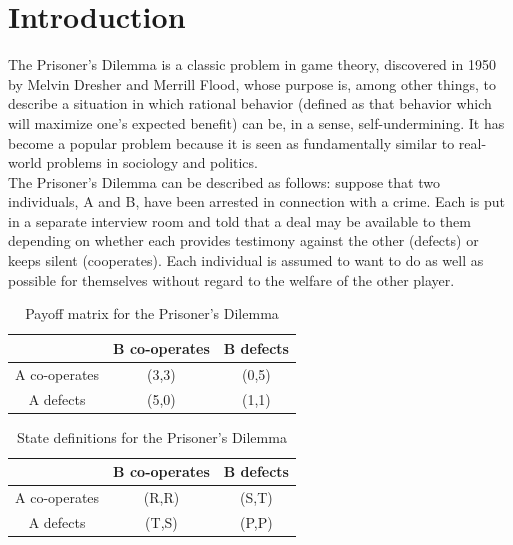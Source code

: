 \documentclass[a4paper]{article}
\begin{document}
	\tableofcontents
	
	\pagebreak	
	
	\section{Introduction}
	
	The Prisoner's Dilemma is a classic problem in game theory, discovered in 1950 by Melvin Dresher and Merrill Flood, whose purpose is, among other things, to describe a situation in which rational behavior (defined as that behavior which will maximize one's expected benefit) can be, in a sense, self-undermining. It has become a popular problem because it is seen as fundamentally similar to real-world problems in sociology and politics. \\
	The Prisoner's Dilemma can be described as follows: suppose that two individuals, A and B, have been arrested in connection with a crime. Each is put in a separate interview room and told that a deal may be available to them depending on whether each provides testimony against the other (defects) or keeps silent (cooperates). Each individual is assumed to want to do as well as possible for themselves without regard to the welfare of the other player.\\

	\tabcolsep=0.51cm
	\begin{table}[H]
	\centering
	\begin{tabular}{|c|c|c|}
	\hline
						& B co-operates            & B defects 					\\ \hline
	A co-operates  		& (3,3) 		 			& (0,5)         			\\ \hline
	A defects 			& (5,0)           			& (1,1)            			\\ \hline
	\end{tabular}
	\caption{Payoff matrix for the Prisoner's Dilemma}
	\end{table}
		
	\begin{table}[H]
	\centering
	\begin{tabular}{|c|c|c|}
	\hline
						& B co-operates            & B defects 					\\ \hline
	A co-operates  		& (R,R) 		 			& (S,T)         			\\ \hline
	A defects 			& (T,S)           			& (P,P)            			\\ \hline
	\end{tabular}
	\caption{State definitions for the Prisoner's Dilemma}
	\end{table}
\end{document}
